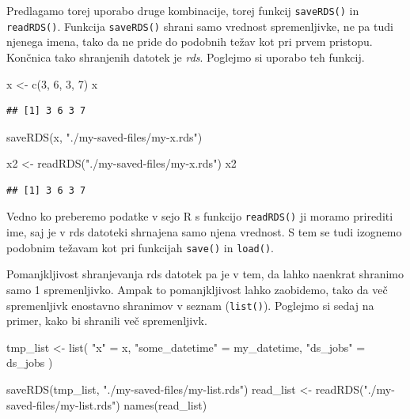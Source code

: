 \documentclass[
]{book}
\newenvironment{Shaded}{\begin{snugshade}}{\end{snugshade}}
\newcommand{\DecValTok}[1]{\textcolor[rgb]{0.00,0.00,0.81}{#1}}
\newcommand{\FunctionTok}[1]{\textcolor[rgb]{0.00,0.00,0.00}{#1}}
\newcommand{\NormalTok}[1]{#1}
\newcommand{\OtherTok}[1]{\textcolor[rgb]{0.56,0.35,0.01}{#1}}
\newcommand{\StringTok}[1]{\textcolor[rgb]{0.31,0.60,0.02}{#1}}
\begin{document}
Predlagamo torej uporabo druge kombinacije, torej funkcij \texttt{saveRDS()} in \texttt{readRDS()}. Funkcija \texttt{saveRDS()} shrani samo vrednost spremenljivke, ne pa tudi njenega imena, tako da ne pride do podobnih težav kot pri prvem pristopu. Končnica tako shranjenih datotek je \emph{rds}. Poglejmo si uporabo teh funkcij.

\begin{Shaded}
\begin{Highlighting}[]
\NormalTok{x }\OtherTok{\textless{}{-}} \FunctionTok{c}\NormalTok{(}\DecValTok{3}\NormalTok{, }\DecValTok{6}\NormalTok{, }\DecValTok{3}\NormalTok{, }\DecValTok{7}\NormalTok{)}
\NormalTok{x}
\end{Highlighting}
\end{Shaded}

\begin{verbatim}
## [1] 3 6 3 7
\end{verbatim}

\begin{Shaded}
\begin{Highlighting}[]
\FunctionTok{saveRDS}\NormalTok{(x, }\StringTok{"./my{-}saved{-}files/my{-}x.rds"}\NormalTok{)}

\NormalTok{x2 }\OtherTok{\textless{}{-}} \FunctionTok{readRDS}\NormalTok{(}\StringTok{"./my{-}saved{-}files/my{-}x.rds"}\NormalTok{)}
\NormalTok{x2}
\end{Highlighting}
\end{Shaded}

\begin{verbatim}
## [1] 3 6 3 7
\end{verbatim}

Vedno ko preberemo podatke v sejo R s funkcijo \texttt{readRDS()} ji moramo prirediti ime, saj je v rds datoteki shrnajena samo njena vrednost. S tem se tudi izognemo podobnim težavam kot pri funkcijah \texttt{save()} in \texttt{load()}.

Pomanjkljivost shranjevanja rds datotek pa je v tem, da lahko naenkrat shranimo samo 1 spremenljivko. Ampak to pomanjkljivost lahko zaobidemo, tako da več spremenljivk enostavno shranimov v seznam (\texttt{list()}). Poglejmo si sedaj na primer, kako bi shranili več spremenljivk.

\begin{Shaded}
\begin{Highlighting}[]
\NormalTok{tmp\_list }\OtherTok{\textless{}{-}} \FunctionTok{list}\NormalTok{(}
  \StringTok{"x"} \OtherTok{=}\NormalTok{ x,}
  \StringTok{"some\_datetime"} \OtherTok{=}\NormalTok{ my\_datetime,}
  \StringTok{"ds\_jobs"} \OtherTok{=}\NormalTok{ ds\_jobs}
\NormalTok{)}

\FunctionTok{saveRDS}\NormalTok{(tmp\_list, }\StringTok{"./my{-}saved{-}files/my{-}list.rds"}\NormalTok{)}
\NormalTok{read\_list }\OtherTok{\textless{}{-}} \FunctionTok{readRDS}\NormalTok{(}\StringTok{"./my{-}saved{-}files/my{-}list.rds"}\NormalTok{)}
\FunctionTok{names}\NormalTok{(read\_list)}
\end{Highlighting}
\end{Shaded}
\end{document}
